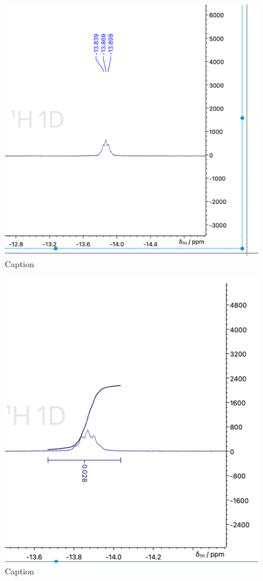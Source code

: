 \begin{figure}
    \centering
    \includegraphics[width=0.8\linewidth]{Relazione/foto/CoH_hydridepeak_calc.png}
    \caption{Caption}
    \label{fig:my_label}
\end{figure}
\begin{figure}
    \centering
    \includegraphics[width=0.8\linewidth]{Relazione/foto/CoH_hydridepeak_right.png}
    \caption{Caption}
    \label{fig:my_label}
\end{figure}



